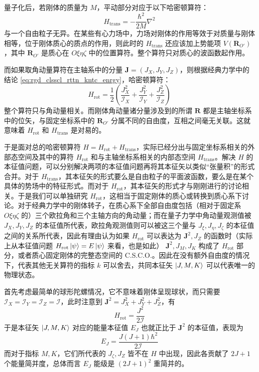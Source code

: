 \documentclass[cn,10pt,math=newtx,citestyle=gb7714-2015,bibstyle=gb7714-2015]{elegantbook}
\def\bm{\boldsymbol}
\def\mc{\mathcal}
\begin{document}
量子化后，若刚体的质量为 $M$，平动部分对应于以下哈密顿算符：
\begin{equation}
    H_\text{trans} = -\frac{\hbar^2}{2M}\nabla^2
\end{equation}
与一个自由粒子无异。在某些有心力场中，力场对刚体的作用等效于对质量与刚体相等，位于刚体质心的质点的作用，则此时的 $H_\text{trans}$ 还应该加上势能项 $V(\bm R_{O'})$，其中 $\bm R_{O'}$ 是质心在 $O\xi\eta\zeta$ 中的位置算符。整个算符只对质心的波函数起作用。

而如果取角动量算符在主轴系中的分量 $\bm J=(J_X,J_Y,J_Z)$，则根据经典力学中的结论 \ref{eq:rgd_clsscl_rttn_kntc_enrgy}，哈密顿算符：
\begin{equation}
    H_\text{rot} = \frac 1 2\left(\frac{J_X^2}{\mc I_X}+\frac{J_Y^2}{\mc I_Y}+\frac{J_Z^2}{\mc I_Z}\right)
\end{equation}
整个算符只与角动量相关。而刚体角动量诸分量涉及到的所谓 $\bm R$ 都是主轴坐标系中的位矢，与固定坐标系中的 $\bm R_{O'}$ 分属不同的自由度，互相之间毫无关联。这就意味着 $H_\text{rot}$ 和 $H_\text{trans}$ 是对易的。

于是面对总的哈密顿算符 $H = H_\text{rot}+H_\text{trans}$，实际已经分出与固定坐标系相关的外部态空间及其中的算符 $H_\text{rot}$ 和与主轴坐标系相关的内部态空间 $H_\text{trans}$。解决 $H$ 的本征值问题，可以分别解决两项的本征值问题再将其本征矢以类似“张量积”的形式合并。对于 $H_\text{trans}$，其本征矢的形式要么是自由粒子的平面波函数，要么是在某个具体的势场中的特征形式。而对于 $H_\text{rot}$，其本征矢的形式才与刚刚进行的讨论相关。于是我们可以单独研究 $H_\text{rot}$，这相当于固定刚体的质心或转换到质心系下讨论。对于经典力学中的刚体转子，在质心系下全部自由度包括（相对于固定系 $O\xi\eta\zeta$ 的）三个欧拉角和三个主轴方向的角动量；而在量子力学中角动量观测值被 $J_X,J_Y,J_Z$ 的本征值所代表，欧拉角观测值则可以被这三个量与 $J_\xi,J_\eta,J_\zeta$ 的本征值之间的关系所代表，因此有理由认为如果 $H_\text{rot}$ 可以表达为 $\bm J^2,J_Z$ 的函数时（实际上从本征值问题 $H_\text{rot}\ket{\psi} = E\ket{\psi}$ 来看，也是如此） $\bm J^2,J_M,J_K$ 构成了 $H_\text{rot}$ 部分，或者质心固定刚体的完整态空间的 C.S.C.O.。因此在没有额外自由度的情况下，代表其他无关算符的指标 $k$ 可以舍去，共同本征矢 $\ket{J,M,K}$ 可以代表唯一的物理状态。

首先考虑最简单的球形陀螺情况，它不意味着刚体呈现球状，而只需要 $\mc I_X = \mc I_Y=\mc I_Z = \mc I$，此时注意到 $\bm J^2 = J_X^2+J_Y^2+J_Z^2$，有
\begin{equation}
    H_\text{rot} = \frac{J^2}{2\mc I}
\end{equation}
于是本征矢 $\ket{J,M,K}$ 对应的能量本征值 $E_J$ 也就正比于 $\bm J^2$ 的本征值，表现为
\begin{equation}
    E_J = \frac{J(J+1)\hbar^2}{2\mc I}
\end{equation}
而对于指标 $M,K$，它们所代表的 $J_\zeta,J_Z$ 皆不在 $H$ 中出现，因此各贡献了 $2J+1$ 个能量简并度，总体而言 $E_J$ 能级是 $(2J+1)^2$ 重简并的。
\end{document}
